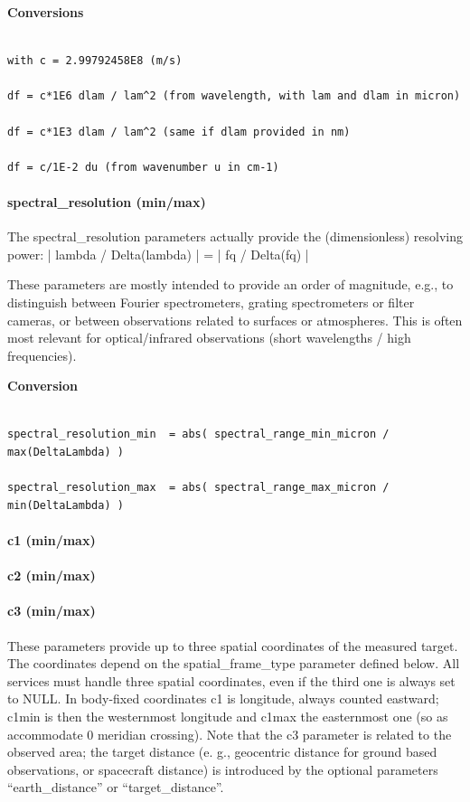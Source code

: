 \documentclass[11pt,a4paper]{ivoa}
\begin{document}
\textbf{Conversions}

\begin{verbatim}

with c = 2.99792458E8 (m/s)

df = c*1E6 dlam / lam^2 (from wavelength, with lam and dlam in micron)

df = c*1E3 dlam / lam^2 (same if dlam provided in nm)

df = c/1E-2 du (from wavenumber u in cm-1)

\end{verbatim}

\paragraph{spectral\_resolution (min/max)}

The spectral\_resolution parameters actually provide the (dimensionless) resolving power: | lambda / Delta(lambda) | = | fq / Delta(fq) |  

These parameters are mostly intended to provide an order of magnitude, e.g., to distinguish between Fourier spectrometers, grating spectrometers or filter cameras, or between observations related to surfaces or atmospheres. This is often most relevant for optical/infrared observations (short wavelengths / high frequencies).


\textbf{Conversion}

\begin{verbatim}

spectral_resolution_min  = abs( spectral_range_min_micron / max(DeltaLambda) )

spectral_resolution_max  = abs( spectral_range_max_micron / min(DeltaLambda) )

\end{verbatim}

\paragraph{c1 (min/max)}

\paragraph{c2 (min/max)}

\paragraph{c3 (min/max)}

These parameters provide up to three spatial coordinates of the measured target. The coordinates depend on the spatial\_frame\_type parameter defined below. All services must handle three spatial coordinates, even if the third one is always set to NULL. In body-fixed coordinates c1 is longitude, always counted eastward; c1min is then the westernmost longitude and c1max the easternmost one (so as accommodate 0 meridian crossing). Note that the c3 parameter is related to the observed area; the target distance (e. g., geocentric distance for ground based observations, or spacecraft distance) is introduced by the optional parameters  ``earth\_distance'' or ``target\_distance''.
\end{document}
